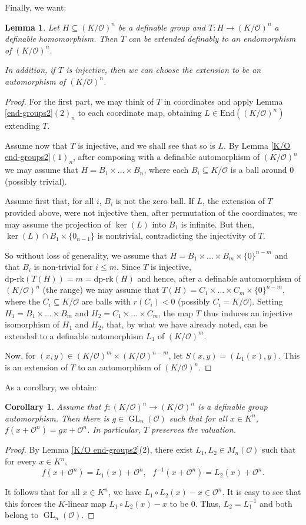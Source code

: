 \documentclass[11pt]{amsart}
\DeclareMathOperator{\gl}{GL} \DeclareMathOperator{\agl}{AGL}
\newtheorem{corollary}[theorem]{Corollary}
\newtheorem{lemma}[theorem]{Lemma}
\theoremstyle{definition}
\newcommand{\CO}{{\mathcal O}}
\newcommand{\0}{\emptyset}
\def\dpr{\mathrm{dp\text{-}rk}}
\def\sub{\subseteq}
\begin{document}
Finally, we want:
\begin{lemma} \label{automorphism} 
Let $H\sub (K/\CO)^n$ be a definable group and $T:H\to (K/\CO)^n$
a definable homomorphism. Then $T$ can be extended definably to an endomorphism of $(K/\CO)^n$.

In addition, if $T$ is injective, then we can choose the extension to be an automorphism of $(K/\CO)^n$.
\end{lemma}
\begin{proof}
    For the first part, we may think of $T$ in coordinates and apply Lemma \ref{end-groups2}$(2)_n$ to each coordinate map, obtaining $L\in \mathrm{End}((K/\CO)^n)$ extending $T$.

Assume now that $T$ is injective, and we shall see that so is $L$. By Lemma \ref{K/O end-groups2}$(1)_n$, after composing with a definable automorphism of $(K/\CO)^n$ we may assume that $H=B_1\times\dots\times B_n$,  where each $B_i\sub K/\CO$ is a ball around $0$ (possibly trivial). 

Assume first that, for all $i$, $B_i$ is not the zero ball. If $L$, the extension of $T$ provided above, were not injective then, after permutation of the coordinates, we may assume the projection of $\ker(L)$ into $B_1$ is infinite.  But then, $\ker(L)\cap B_1\times \{0_{n-1}\}$ is nontrivial, contradicting the injectivity of $T$.  

  So without loss of generality, we assume that $H=B_1\times\dots\times B_m\times \{0\}^{n-m}$ and that $B_i$ is non-trivial for $i\leq m$. Since $T$ is injective, $\dpr(T(H))=m=\dpr(H)$ and hence, after a definable automorphism of $(K/\CO)^n$ (the range) we may assume that $T(H)=C_1\times\dots\times C_m\times \{0\}^{n-m}$, where the $C_i\sub K/\CO$ are balls with $r(C_i)<0$ (possibly $C_i=K/\CO$). Setting $H_1=B_1\times\dots \times B_m$ and $H_2=C_1\times\dots\times C_m$, the map $T$ thus induces an injective isomorphism of $H_1$ and $H_2$, that, by what we have already noted, can be extended to a definable automorphism $L_1$ of $(K/\CO)^m$.  

  Now, for $(x,y)\in (K/\CO)^m\times (K/\CO)^{n-m}$, let $S(x,y)=(L_1(x),y)$. This is an extension of $T$ to an automorphism of $(K/\CO)^n$.
\end{proof}
As a corollary, we obtain:


\begin{corollary}\label{C: same valuation}
    Assume that  $f:(K/\CO)^n\to (K/\CO)^n$ is a definable group automorphism.
    Then there is $g\in \gl_n(\CO)$ such that for all $x\in K^n$, $f(x+\CO^n)=gx+\CO^n$. In particular, $T$ preserves the valuation.
\end{corollary}
\begin{proof}
    By Lemma \ref{K/O end-groups2}(2), there exist $L_1,L_2\in M_n(\CO)$ such that for every $x\in K^n$, 
    $$f(x+\CO^n)=L_1(x)+\CO^n,\,\,\,\, f^{-1}(x+\CO^n)=L_2(x)+\CO^n.$$
    
    It follows that for all $x\in K^n$, we have $L_1\circ L_2(x)-x\in \CO^n$. It is easy to see that this forces the $K$-linear map $L_1\circ L_2(x)-x$ to be $0$. Thus, $L_2=L_1^{-1}$ and both belong to $\gl_n(\CO)$.
\end{proof}
\end{document}
